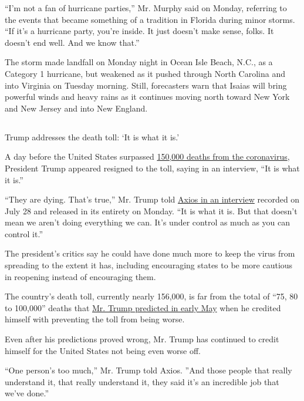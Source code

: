 ``I'm not a fan of hurricane parties,'' Mr. Murphy said on Monday,
referring to the events that became something of a tradition in Florida
during minor storms. ``If it's a hurricane party, you're inside. It just
doesn't make sense, folks. It doesn't end well. And we know that.''

The storm made landfall on Monday night in Ocean Isle Beach, N.C., as a
Category 1 hurricane, but weakened as it pushed through North Carolina
and into Virginia on Tuesday morning. Still, forecasters warn that
Isaias will bring powerful winds and heavy rains as it continues moving
north toward New York and New Jersey and into New England.

\hypertarget{-4}{%
\subsection{}\label{-4}}

Trump addresses the death toll: `It is what it is.'

A day before the United States surpassed
\href{https://www.nytimes.com/2020/07/29/us/coronavirus-deaths-150000.html}{150,000
deaths from the coronavirus}, President Trump appeared resigned to the
toll, saying in an interview, ``It is what it is.''

``They are dying. That's true,'' Mr. Trump told
\href{https://www.axios.com/full-axios-hbo-interview-donald-trump-cd5a67e1-6ba1-46c8-bb3d-8717ab9f3cc5.html}{Axios
in an interview} recorded on July 28 and released in its entirety on
Monday. ``It is what it is. But that doesn't mean we aren't doing
everything we can. It's under control as much as you can control it.''

The president's critics say he could have done much more to keep the
virus from spreading to the extent it has, including encouraging states
to be more cautious in reopening instead of encouraging them.

The country's death toll, currently nearly 156,000, is far from the
total of ``75, 80 to 100,000'' deaths that
\href{https://www.nytimes.com/2020/05/03/us/politics/trump-coronavirus.html}{Mr.
Trump predicted in early May} when he credited himself with preventing
the toll from being worse.

Even after his predictions proved wrong, Mr. Trump has continued to
credit himself for the United States not being even worse off.

``One person's too much,'' Mr. Trump told Axios. ''And those people that
really understand it, that really understand it, they said it's an
incredible job that we've done.''

